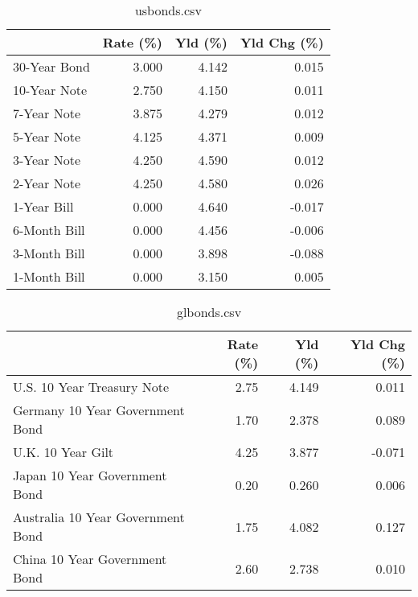 \documentclass{article}%
\begin{document}
%


\begin{table}[htbp]%
\caption{usbonds.csv}%
\centering%
\begin{adjustbox}{width=1\textwidth}%
\begin{tabular}{lrrr}
\toprule
             &  Rate (\%) &  Yld (\%) &  Yld Chg (\%) \\
\midrule
30-Year Bond &     3.000 &    4.142 &        0.015 \\
10-Year Note &     2.750 &    4.150 &        0.011 \\
 7-Year Note &     3.875 &    4.279 &        0.012 \\
 5-Year Note &     4.125 &    4.371 &        0.009 \\
 3-Year Note &     4.250 &    4.590 &        0.012 \\
 2-Year Note &     4.250 &    4.580 &        0.026 \\
 1-Year Bill &     0.000 &    4.640 &       -0.017 \\
6-Month Bill &     0.000 &    4.456 &       -0.006 \\
3-Month Bill &     0.000 &    3.898 &       -0.088 \\
1-Month Bill &     0.000 &    3.150 &        0.005 \\
\bottomrule
\end{tabular}
%
\end{adjustbox}%
\end{table}

%


\begin{table}[htbp]%
\caption{glbonds.csv}%
\centering%
\begin{adjustbox}{width=1\textwidth}%
\begin{tabular}{lrrr}
\toprule
                                  &  Rate (\%) &  Yld (\%) &  Yld Chg (\%) \\
\midrule
       U.S. 10 Year Treasury Note &      2.75 &    4.149 &        0.011 \\
  Germany 10 Year Government Bond &      1.70 &    2.378 &        0.089 \\
                U.K. 10 Year Gilt &      4.25 &    3.877 &       -0.071 \\
    Japan 10 Year Government Bond &      0.20 &    0.260 &        0.006 \\
Australia 10 Year Government Bond &      1.75 &    4.082 &        0.127 \\
    China 10 Year Government Bond &      2.60 &    2.738 &        0.010 \\
\bottomrule
\end{tabular}
%
\end{adjustbox}%
\end{table}
\end{document}
